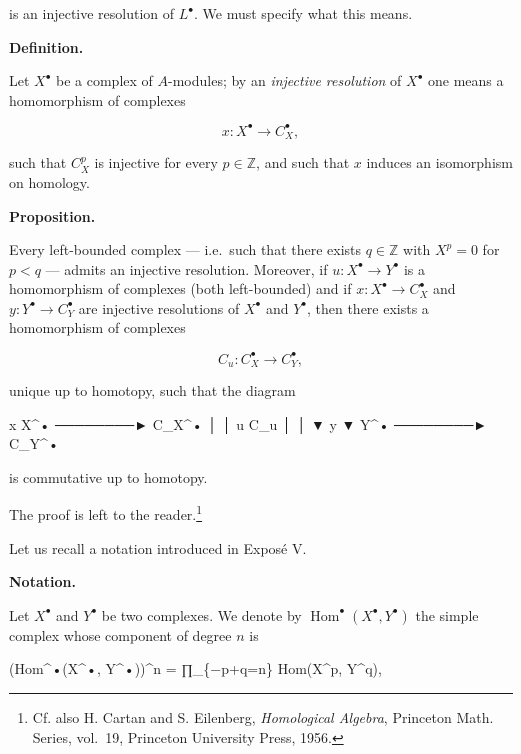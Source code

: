 \documentclass[
]{article}
\newenvironment{Shaded}{}{}
\newcommand{\NormalTok}[1]{#1}
\begin{document}
is an injective resolution of \(L^{\bullet}\). We must specify what this
means.

\textbf{Definition.}

Let \(X^{\bullet}\) be a complex of \(A\)-modules; by an \emph{injective
resolution} of \(X^{\bullet}\) one means a homomorphism of complexes

\[
x : X^{\bullet} \to C^{\bullet}_{X},
\]

such that \(C^{p}_{X}\) is injective for every \(p \in \mathbb{Z}\), and
such that \(x\) induces an isomorphism on homology.

\textbf{Proposition.}

Every left-bounded complex --- i.e.~such that there exists
\(q \in \mathbb{Z}\) with \(X^{p} = 0\) for \(p < q\) --- admits an
injective resolution. Moreover, if \(u : X^{\bullet} \to Y^{\bullet}\)
is a homomorphism of complexes (both left-bounded) and if
\(x : X^{\bullet} \to C^{\bullet}_{X}\) and
\(y : Y^{\bullet} \to C^{\bullet}_{Y}\) are injective resolutions of
\(X^{\bullet}\) and \(Y^{\bullet}\), then there exists a homomorphism of
complexes

\[
C_{u} : C^{\bullet}_{X} \to C^{\bullet}_{Y},
\]

unique up to homotopy, such that the diagram

\begin{Shaded}
\begin{Highlighting}[]
\NormalTok{        x}
\NormalTok{X\^{}•  ────────►  C\_X\^{}•}
\NormalTok{ │                │}
\NormalTok{ u                C\_u}
\NormalTok{ │                │}
\NormalTok{ ▼      y         ▼}
\NormalTok{Y\^{}•  ────────►  C\_Y\^{}•}
\end{Highlighting}
\end{Shaded}

is commutative up to homotopy.

The proof is left to the reader.\footnote{Cf. also H. Cartan and S.
  Eilenberg, \emph{Homological Algebra}, Princeton Math. Series,
  vol.~19, Princeton University Press, 1956.}

Let us recall a notation introduced in Exposé V.

\textbf{Notation.}

Let \(X^{\bullet}\) and \(Y^{\bullet}\) be two complexes. We denote by
\(\operatorname{Hom}^{\bullet}(X^{\bullet}, Y^{\bullet})\) the simple
complex whose component of degree \(n\) is

\begin{Shaded}
\begin{Highlighting}[]
\NormalTok{(Hom\^{}•(X\^{}•, Y\^{}•))\^{}n = ∏\_\{−p+q=n\} Hom(X\^{}p, Y\^{}q),}
\end{Highlighting}
\end{Shaded}
\end{document}
